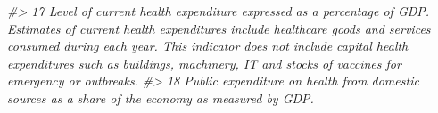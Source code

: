 \documentclass[
  xelatex, ja=standard]{bxjsbook}
\newenvironment{Shaded}{\begin{snugshade}}{\end{snugshade}}
\newcommand{\CommentTok}[1]{\textcolor[rgb]{0.56,0.35,0.01}{\textit{#1}}}
\theoremstyle{definition}
\theoremstyle{definition}
\theoremstyle{definition}
\theoremstyle{definition}
\theoremstyle{remark}
\begin{document}
\begin{Shaded}
\begin{Highlighting}[]
\CommentTok{\#\textgreater{} 17                                                                                                                                                                                                                                                                                                                                                                                                                                                                                                                                                                                                                                                                                                                                                                                                                                                                                                                                                                                                                                                                                                                  Level of current health expenditure expressed as a percentage of GDP.  Estimates of current health expenditures include healthcare goods and services consumed during each year. This indicator does not include capital health expenditures such as buildings, machinery, IT and stocks of vaccines for emergency or outbreaks.}
\CommentTok{\#\textgreater{} 18                                                                                                                                                                                                                                                                                                                                                                                                                                                                                                                                                                                                                                                                                                                                                                                                                                                                                                                                                                                                                                                                                                                                                                                                                                                                                                                                                  Public expenditure on health from domestic sources as a share of the economy as measured by GDP.}

\end{Highlighting}
\end{Shaded}
\end{document}
